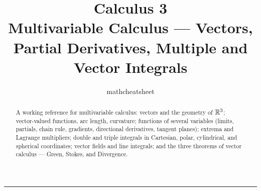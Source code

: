 \documentclass[11pt]{article}
\title{\textbf{Calculus 3}\\[2pt]\large Multivariable Calculus --- Vectors, Partial Derivatives, Multiple and Vector Integrals}
\author{mathcheatsheet}
\date{}
\begin{document}
\maketitle
\thispagestyle{empty}

\begin{abstract}
\noindent A working reference for multivariable calculus: vectors and the
geometry of $\mathbb{R}^3$; vector-valued functions, arc length, curvature;
functions of several variables (limits, partials, chain rule, gradients,
directional derivatives, tangent planes); extrema and Lagrange multipliers;
double and triple integrals in Cartesian, polar, cylindrical, and spherical
coordinates; vector fields and line integrals; and the three theorems of
vector calculus --- Green, Stokes, and Divergence.
\end{abstract}

\tableofcontents
\bigskip\hrule\bigskip









\end{document}
